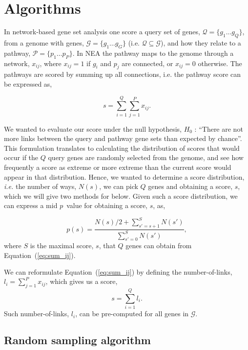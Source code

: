 \documentclass[a4paper,american]{lipics-v2016}
\begin{document}
\section*{Algorithms}

In network-based gene set analysis one score a query set of genes, $ \mathcal{Q}=\{g_1 \ldots g_Q\}$, from a genome with genes, $\mathcal{G}=\{g_1 \ldots g_G\}$ (i.e. $\mathcal{Q} \subseteq \mathcal{G}$), and how they relate to a pathway, $\mathcal{P}=\{p_1 \ldots p_P\}$. In NEA the pathway maps to the genome through a network, ${x_{ij}}$, where $x_{ij}=1$ if $g_i$ and $p_j$ are connected, or $x_{ij}=0$ otherwise. The pathways are scored by summing up all connections, i.e. the pathway score can be expressed as,

\begin{equation}
s=\sum_{i=1}^Q\sum_{j=1}^P x_{ij}.
\label{eq:sum_ij}
\end{equation}

We wanted to evaluate our score under the null hypothesis, $H_0$ : ``There are not more links between the query and pathway gene sets than expected by chance''. This  formulation translates to calculating the distribution of scores that would occur if the $Q$ query genes are randomly selected from the genome, and see how frequently a score as extreme or more extreme than the current score would appear in that distribution. Hence, we wanted to determine a score distribution, {\em i.e.} the number of ways, $N(s)$, we can pick $Q$ genes and obtaining a score, $s$, which we will give two methods for below. Given such a score distribution, we can express a mid $p$~value\cite{lancaster1961significance,hwang2001optimality} for obtaining a score, $s$, as,

\begin{equation}
p(s)=\frac{N(s)/2 +\sum_{s'=s+1}^{S} N(s')}{\sum_{s'=0}^{S} N(s')},
\label{eq:pval}
\end{equation}
where $S$ is the maximal score, $s$, that $Q$ genes can obtain from Equation~(\ref{eq:sum_ij}).

We can reformulate Equation~(\ref{eq:sum_ij}) by defining the number-of-links, $l_i=\sum_{j=1}^P x_{ij}$, which gives us a score,
\begin{equation}
s=\sum_{i=1}^Q l_i.
\label{eq:sum_i}
\end{equation}
Such number-of-links, $l_i$, can be pre-computed for all genes in $\mathcal{G}$.

\subsection*{Random sampling algorithm}
\end{document}
